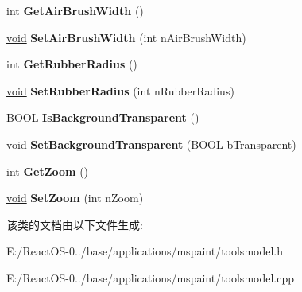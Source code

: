 \begin{DoxyCompactItemize}
int {\bfseries Get\+Air\+Brush\+Width} ()
\item 
\mbox{\label{class_tools_model_a7bc1400ae9b94785d1390de8b6316eda}} 
\hyperlink{interfacevoid}{void} {\bfseries Set\+Air\+Brush\+Width} (int n\+Air\+Brush\+Width)
\item 
\mbox{\label{class_tools_model_a27869522941841137ae02473869ca5a4}} 
int {\bfseries Get\+Rubber\+Radius} ()
\item 
\mbox{\label{class_tools_model_a8e1be56edac41f6d3ffc11cf7ac6d7c6}} 
\hyperlink{interfacevoid}{void} {\bfseries Set\+Rubber\+Radius} (int n\+Rubber\+Radius)
\item 
\mbox{\label{class_tools_model_a1fb11757a2dc011967903d61d92fd75f}} 
B\+O\+OL {\bfseries Is\+Background\+Transparent} ()
\item 
\mbox{\label{class_tools_model_aa7ce33ab244d105e3d9a3c608d13e045}} 
\hyperlink{interfacevoid}{void} {\bfseries Set\+Background\+Transparent} (B\+O\+OL b\+Transparent)
\item 
\mbox{\label{class_tools_model_a66cca82efed80528e5496d9b1288b350}} 
int {\bfseries Get\+Zoom} ()
\item 
\mbox{\label{class_tools_model_aa34e265f015026e18bbbe1981c8a3cd8}} 
\hyperlink{interfacevoid}{void} {\bfseries Set\+Zoom} (int n\+Zoom)
\end{DoxyCompactItemize}


该类的文档由以下文件生成\+:\begin{DoxyCompactItemize}
\item 
E\+:/\+React\+O\+S-\/0../base/applications/mspaint/toolsmodel.\+h\item 
E\+:/\+React\+O\+S-\/0../base/applications/mspaint/toolsmodel.\+cpp\end{DoxyCompactItemize}
